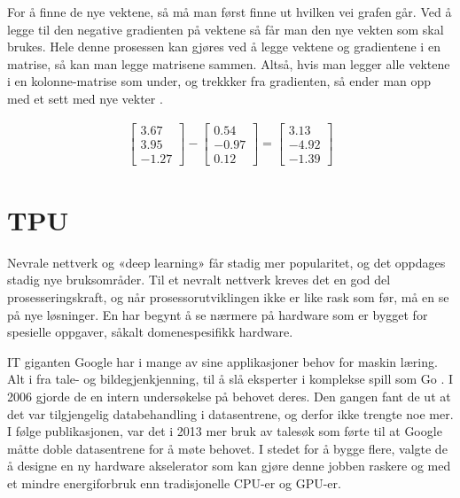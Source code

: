 \newpage
For å finne de nye vektene, så må man først finne ut hvilken vei grafen går. Ved å legge til den negative gradienten på vektene så får man den nye vekten som skal brukes. Hele denne prosessen kan gjøres ved å legge vektene og gradientene i en matrise, så kan man legge matrisene sammen. Altså, hvis man legger alle vektene i en kolonne-matrise som under, og trekkker fra gradienten, så ender man opp med et sett med nye vekter \cite{neural_net}.

\begin{align}
	\begin{bmatrix}
		 3.67 \\
		3.95 \\
		-1.27
	\end{bmatrix} - 
	\begin{bmatrix}
		 0.54 \\
		-0.97 \\
		 0.12
	\end{bmatrix} = 
	\begin{bmatrix}
		 3.13 \\
		-4.92 \\
		-1.39
	\end{bmatrix}
\end{align}


\newpage
\section{TPU}
Nevrale nettverk og «deep learning» får stadig mer popularitet, og det oppdages stadig nye bruksområder. Til et nevralt nettverk kreves det en god del prosesseringskraft, og når prosessorutviklingen ikke er like rask som før, må en se på nye løsninger. En har begynt å se nærmere på hardware som er bygget for spesielle oppgaver, såkalt domenespesifikk hardware. 

IT giganten Google har i mange av sine applikasjoner behov for maskin læring. Alt i fra tale- og bildegjenkjenning, til å slå eksperter i komplekse spill som Go \cite{look_at_TPU}. I 2006 gjorde de en intern undersøkelse på behovet deres. Den gangen fant de ut at det var tilgjengelig databehandling i datasentrene, og derfor ikke trengte noe mer. I følge publikasjonen, var det i 2013 mer bruk av talesøk som førte til at Google måtte doble datasentrene for å møte behovet. I stedet for å bygge flere, valgte de å designe en ny hardware akselerator som kan gjøre denne jobben raskere og med et mindre energiforbruk enn tradisjonelle CPU-er og GPU-er.

